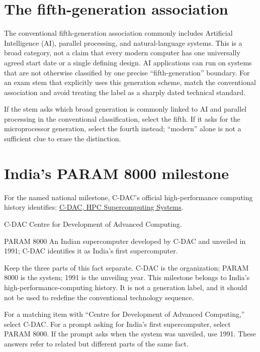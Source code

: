 \section{The fifth-generation association}
The conventional fifth-generation association commonly includes Artificial
Intelligence (AI), parallel processing, and natural-language systems. This
is a broad category, not a claim that every modern computer has one
universally agreed start date or a single defining design. AI applications
can run on systems that are not otherwise classified by one precise
``fifth-generation'' boundary. For an exam stem that explicitly uses this
generation scheme, match the conventional association and avoid treating
the label as a sharply dated technical standard.

\begin{example}
If the stem asks which broad generation is commonly linked to AI and
parallel processing in the conventional classification, select the fifth.
If it asks for the microprocessor generation, select the fourth instead;
``modern'' alone is not a sufficient clue to erase the distinction.
\end{example}

\section{India's PARAM 8000 milestone}
For the named national milestone, C-DAC's official high-performance
computing history identifies:
\href{https://cdac.in/index.aspx?id=hpc_ss_supercomputing_systems}
{C-DAC, HPC Supercomputing Systems}.

\begin{definitionbox}{C-DAC}
Centre for Development of Advanced Computing.
\end{definitionbox}

\begin{definitionbox}{PARAM 8000}
An Indian supercomputer developed by C-DAC and unveiled in 1991; C-DAC
identifies it as India's first supercomputer.
\end{definitionbox}

Keep the three parts of this fact separate. C-DAC is the organization;
PARAM 8000 is the system; 1991 is the unveiling year. This milestone
belongs to India's high-performance-computing history. It is not a
generation label, and it should not be used to redefine the conventional
technology sequence.

\begin{example}
For a matching item with ``Centre for Development of Advanced Computing,''
select C-DAC. For a prompt asking for India's first supercomputer, select
PARAM 8000. If the prompt asks when the system was unveiled, use 1991.
These answers refer to related but different parts of the same fact.
\end{example}

